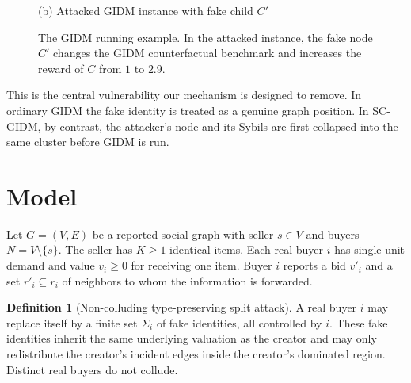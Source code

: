 \documentclass[sigconf]{aamas}
\theoremstyle{definition}
\newtheorem{definition}[theorem]{Definition}
\theoremstyle{remark}
\newcommand{\G}{G}
\begin{document}
\begin{figure}[t]
\begin{minipage}[t]{0.48\textwidth}

\small (b) Attacked GIDM instance with fake child $C'$
\end{minipage}
\caption{The GIDM running example. In the attacked instance, the fake node $C'$ changes the GIDM counterfactual benchmark and increases the reward of $C$ from $1$ to $2.9$.}
\label{fig:gidmattack}
\end{figure}

This is the central vulnerability our mechanism is designed to remove. In ordinary GIDM the fake identity is treated as a genuine graph position. In SC-GIDM, by contrast, the attacker's node and its Sybils are first collapsed into the same cluster before GIDM is run.

\section{Model}
Let $\G=(V,E)$ be a reported social graph with seller $s\in V$ and buyers $N=V\setminus\{s\}$. The seller has $K\ge 1$ identical items. Each real buyer $i$ has single-unit demand and value $v_i\ge 0$ for receiving one item. Buyer $i$ reports a bid $v'_i$ and a set $r'_i\subseteq r_i$ of neighbors to whom the information is forwarded.

\begin{definition}[Non-colluding type-preserving split attack]
A real buyer $i$ may replace itself by a finite set $\Sigma_i$ of fake identities, all controlled by $i$. These fake identities inherit the same underlying valuation as the creator and may only redistribute the creator's incident edges inside the creator's dominated region. Distinct real buyers do not collude.
\end{definition}
\end{document}
